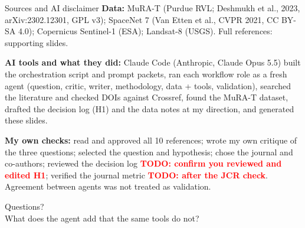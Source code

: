 \documentclass[aspectratio=169,11pt]{beamer}
\newcommand{\todo}[1]{\textcolor{red}{\textbf{TODO: #1}}}
\begin{document}
\begin{frame}{Sources and AI disclaimer}
\footnotesize
\textbf{Data:} MuRA-T (Purdue RVL; Deshmukh et al., 2023, arXiv:2302.12301, GPL v3); SpaceNet 7 (Van Etten et al., CVPR 2021, CC BY-SA 4.0); Copernicus Sentinel-1 (ESA); Landsat-8 (USGS). Full references: supporting slides.

\vspace{6pt}
\textbf{AI tools and what they did:} Claude Code (Anthropic, Claude Opus 5.5) built the orchestration script and prompt packets, ran each workflow role as a fresh agent (question, critic, writer, methodology, data + tools, validation), searched the literature and checked DOIs against Crossref, found the MuRA-T dataset, drafted the decision log (H1) and the data notes at my direction, and generated these slides.

\vspace{6pt}
\textbf{My own checks:} read and approved all 10 references; wrote my own critique of the three questions; selected the question and hypothesis; chose the journal and co-authors; reviewed the decision log \todo{confirm you reviewed and edited H1}; verified the journal metric \todo{after the JCR check}. Agreement between agents was not treated as validation.
\end{frame}

\begin{frame}[standout]
Questions?\\[6pt]
{\normalsize What does the agent add that the same tools do not?}
\end{frame}
\end{document}
